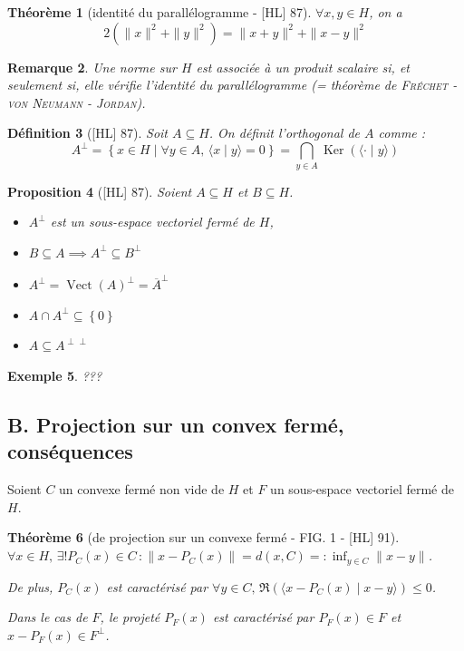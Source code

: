 \documentclass[10pt, a4paper, parskip=full, twoside, twocolumn]{report}
\newtheorem{definition}{Définition}
\newtheorem{theorem}[definition]{Théorème}
\newtheorem{proposition}[definition]{Proposition}
\newtheorem{example}[definition]{Exemple}
\newtheorem{remark}[definition]{Remarque}
\newcommand{\ps}[2]{\langle #1\mid #2\rangle}
\DeclareMathOperator{\Ker}{Ker}
\DeclareMathOperator{\Vect}{Vect}
\begin{document}
\begin{theorem}[identité du parallélogramme - \textnormal{[HL] 87}]
	$\forall x,y\in H$, on a 
	$$2(\|x\|^2+\|y\|^2) = \|x+y\|^2 + \|x-y\|^2$$
\end{theorem}

\begin{remark}
	Une norme sur $H$ est associée à un produit scalaire si, et seulement si, elle vérifie l'identité du parallélogramme (= théorème de \textsc{Fréchet - von Neumann - Jordan}).
\end{remark}

\begin{definition}[\textnormal{[HL] 87}]
	Soit $A\subseteq H$. On définit l'\emph{orthogonal de $A$} comme :
	$$A^{\perp} = \left\{x\in H \mid \forall y\in A,\, \ps{x}{y} = 0\right\} = \bigcap_{y\in A} \Ker\left(\ps{\cdot}{y}\right)$$
\end{definition}

\begin{proposition}[\textnormal{[HL] 87}]
	Soient $A\subseteq H$ et $B\subseteq H$.
	\begin{itemize}
		\item $A^{\perp}$ est un sous-espace vectoriel fermé de $H$,
		\item $B\subseteq A\implies A^{\perp}\subseteq B^{\perp}$
		\item $A^{\perp}=\Vect(A)^{\perp}=\overline{A}^{\perp}$
		\item $A\cap A^{\perp} \subseteq \left\{0\right\}$
		\item $A\subseteq A^{\perp\perp}$
	\end{itemize}
\end{proposition}

\begin{example}
	???
\end{example}

\subsection*{B. Projection sur un convex fermé, conséquences}
\textcolor{paragraphtext}{Soient $C$ un convexe fermé non vide de $H$ et $F$ un sous-espace vectoriel fermé de $H$.}

\begin{tcolorbox}[
    breakable, %
    colback=developpement, %
    colframe=gray!0!black, %
    boxrule=0pt, %
    arc=1mm, %
	boxsep=0pt,
	left=0pt, right=0pt, top=0pt, bottom=0pt
]
\begin{theorem}[de projection sur un convexe fermé - FIG. 1 - \textnormal{[HL] 91}]
	\label{213dev1a}
	$\forall x\in H,\, \exists ! P_C(x)\in C\,\colon \|x-P_C(x)\| = d(x,C) =: \inf_{y\in C} \|x-y\|$.

	De plus, $P_C(x)$ est caractérisé par $\forall y\in C,\, \Re(\ps{x-P_C(x)}{x-y})\leq 0$.

	Dans le cas de $F$, le projeté $P_F(x)$ est caractérisé par $P_F(x)\in F$ et $x-P_F(x)\in F^{\perp}$.
\end{theorem}
\end{tcolorbox}
\end{document}
